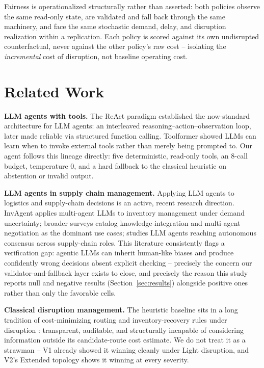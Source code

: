 \documentclass[10pt,twocolumn]{article}
\begin{document}
Fairness is operationalized structurally rather than asserted: both policies observe the same read-only state, are validated and fall back through the same machinery, and face the same stochastic demand, delay, and disruption realization within a replication. Each policy is scored against its own undisrupted counterfactual, never against the other policy's raw cost -- isolating the \emph{incremental} cost of disruption, not baseline operating cost.

\section{Related Work}
\label{sec:relwork}
\textbf{LLM agents with tools.} The ReAct paradigm \cite{yao2022react} established the now-standard architecture for LLM agents: an interleaved reasoning--action--observation loop, later made reliable via structured function calling. Toolformer \cite{schick2023toolformer} showed LLMs can learn when to invoke external tools rather than merely being prompted to. Our agent follows this lineage directly: five deterministic, read-only tools, an 8-call budget, temperature 0, and a hard fallback to the classical heuristic on abstention or invalid output.

\textbf{LLM agents in supply chain management.} Applying LLM agents to logistics and supply-chain decisions is an active, recent research direction. InvAgent \cite{invagent2024} applies multi-agent LLMs to inventory management under demand uncertainty; broader surveys \cite{llmscm2025} catalog knowledge-integration and multi-agent negotiation as the dominant use cases; \cite{agenticscm2025} studies LLM agents reaching autonomous consensus across supply-chain roles. This literature consistently flags a verification gap: agentic LLMs can inherit human-like biases and produce confidently wrong decisions absent explicit checking -- precisely the concern our validator-and-fallback layer exists to close, and precisely the reason this study reports null and negative results (Section~\ref{sec:results}) alongside positive ones rather than only the favorable cells.

\textbf{Classical disruption management.} The heuristic baseline sits in a long tradition of cost-minimizing routing and inventory-recovery rules under disruption \cite{sheffi2005resilient,christopher2004building}: transparent, auditable, and structurally incapable of considering information outside its candidate-route cost estimate. We do not treat it as a strawman -- V1 already showed it winning cleanly under Light disruption, and V2's Extended topology shows it winning at every severity.
\end{document}
